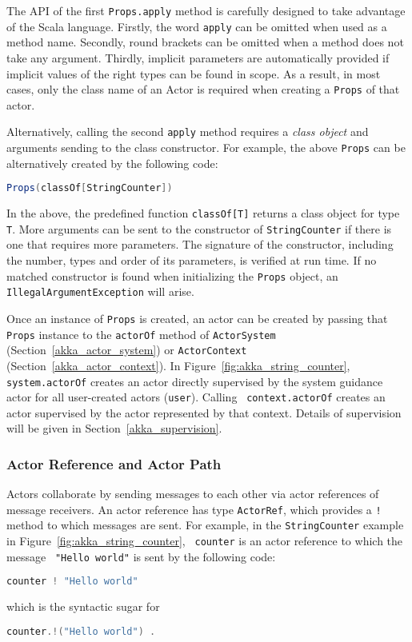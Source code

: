 The API of the first {\tt Props.apply} method is carefully designed to take 
advantage of the Scala language.  Firstly, the word {\tt apply} can be 
omitted when used as a method name. Secondly, round brackets can be 
omitted when a method does not take any argument.  Thirdly, 
implicit parameters are automatically provided if implicit values of the right 
types can be found in scope.  As a result, in most cases, only the class name of 
an Actor is required when creating a {\tt Props} of that actor.

Alternatively, calling the second {\tt apply} method requires a {\it class 
object} and arguments sending to the class constructor.  
For example, the above {\tt Props} can be alternatively created by the following 
code:
\begin{lstlisting}[language=scala]
  Props(classOf[StringCounter])
\end{lstlisting}

In the above, the predefined function {\tt classOf[T]} returns a class object 
for type {\tt T}.  More arguments can 
be sent to the constructor of {\tt StringCounter} if there is one that requires 
more parameters.   The signature of the constructor, including the number, 
types and order of  its parameters, is verified at run time.  If no matched 
constructor is  found when initializing the {\tt Props} object, an {\tt 
IllegalArgumentException} will arise.

Once an instance of {\tt Props} is created, an actor can be created by passing 
that {\tt Props} instance to the {\tt actorOf}  method of {\tt ActorSystem} (Section~\ref{akka_actor_system}) or 
{\tt ActorContext} (Section~\ref{akka_actor_context}). In Figure~\ref{fig:akka_string_counter},
{\tt  system.actorOf} creates an actor directly supervised by the system 
guidance actor  for all user-created actors ({\tt user}).  Calling {\tt 
context.actorOf} creates an actor supervised by the actor represented by that 
context. Details of supervision will be given in Section~\ref{akka_supervision}.

\subsubsection{Actor Reference and Actor Path}
\label{akka_actor_reference}

Actors collaborate by sending messages to each other via actor 
references of message receivers.  An actor reference has type {\tt ActorRef},
which provides a {\tt !} method to which messages are sent.  For example,
in the {\tt StringCounter} example in Figure~\ref{fig:akka_string_counter}, {\tt 
counter} is an actor reference to which the message \textcolor{mauve}{{\tt 
"Hello world"}} is sent by the following code:
\begin{lstlisting}[language=scala]
  counter ! "Hello world"
\end{lstlisting}
which is the syntactic sugar for 
\begin{lstlisting}[language=scala]
  counter.!("Hello world") .
\end{lstlisting}


